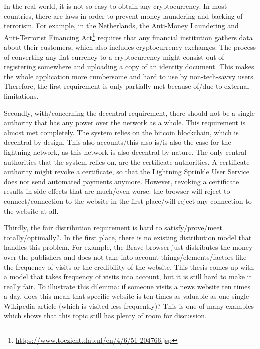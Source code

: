 In the real world, it is not so easy to obtain any cryptocurrency. In most countries, there are laws in order to prevent money laundering and backing of terrorism. For example, in the Netherlands, the Anti-Money Laundering and Anti-Terrorist Financing Act\footnote{\url{https://www.toezicht.dnb.nl/en/4/6/51-204766.jsp}} requires that any financial institution gathers data about their customers, which also includes cryptocurrency exchanges. The process of converting any fiat currency to a cryptocurrency might consist out of registering somewhere and uploading a copy of an identity document. This makes the whole application more cumbersome and hard to use by non-tech-savvy users. Therefore, the first requirement is only partially met because of/due to external limitations.

Secondly, with/concerning the decentral requirement, there should not be a single authority that has any power over the network as a whole. This requirement is almost met completely. The system relies on the bitcoin blockchain, which is decentral by design. This also accounts/this also is/is also the case for the lightning network, as this network is also decentral by nature. The only central authorities that the system relies on, are the certificate authorities. A certificate authority might revoke a certificate, so that the Lightning Sprinkle User Service does not send automated payments anymore. However, revoking a certificate results in side effects that are much/even worse: the browser will reject to connect/connection to the website in the first place/will reject any connection to the website at all.

Thirdly, the fair distribution requirement is hard to satisfy/prove/meet totally/optimally?. In the first place, there is no existing distribution model that handles this problem. For example, the Brave browser just distributes the money over the publishers and does not take into account things/elements/factors like the frequency of visits or the credibility of the website. This thesis comes up with a model that takes frequency of visits into account, but it is still hard to make it really fair. To illustrate this dilemma: if someone visits a news website ten times a day, does this mean that specific website is ten times as valuable as one single Wikipedia article (which is visited less frequently)? This is one of many examples which shows that this topic still has plenty of room for discussion. 



